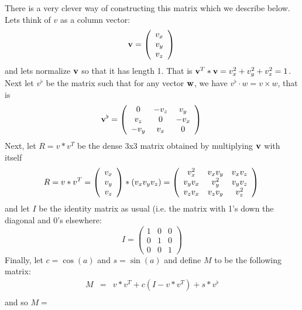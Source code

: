 \documentclass{book}
\newcommand{\vect}[1]{{\bf{ #1}}}
\begin{document}
There is a very clever way of constructing this matrix which we describe below.
Lets think of $v$ as a column vector:
\[
\vect{v} =
\left (
\begin{array}{c}
v_x\\
v_y\\
v_z
\end{array}
\right ) \\
\]
and lets normalize $\vect{v}$ so that it has length 1. That is $\vect{v}^T* \vect{v} = v_x^2+v_y^2+v_z^2 = 1$.
Next let $v^\flat$ be the matrix such that for any vector $\vect{w}$,
we have $v^\flat \cdot w = v \times w$, that is
\[
\vect{v}^\flat =
\left (
\begin{array}{ccc}
0& -v_z & v_y \\
v_z& 0 & -v_x \\
-v_y & v_x & 0 \\
\end{array}
\right ) \\
\]
Next, let $R = v*v^T$ be the dense 3x3 matrix obtained by multiplying $\vect{v}$ with itself
\[
R = v*v^T =
\left (
\begin{array}{c}v_x\\v_y \\ v_z \end{array}\right ) * (v_x v_y v_z) =
\left (
\begin{array}{ccc}
v_x^2 & v_xv_y & v_xv_z \\
v_yv_x & v_y^2 & v_yv_z \\
v_zv_x & v_zv_y & v_z^2
\end{array}
\right ) \\
\]
and let $I$ be the identity matrix as usual (i.e. the matrix with 1's down the diagonal and 0's elsewhere:
\[
I =
\left (
\begin{array}{ccc}
1 & 0 & 0 \\
0 & 1 & 0 \\
0 & 0 & 1
\end{array}
\right )
\]
Finally, let $c=\cos(a)$ and $s=\sin(a)$ and define $M$ to be the following matrix:
\begin{eqnarray*}
M &=& v*v^T + c(I-v*v^T) + s*v^\flat \\
\end{eqnarray*}
and so $M= $
\end{document}
